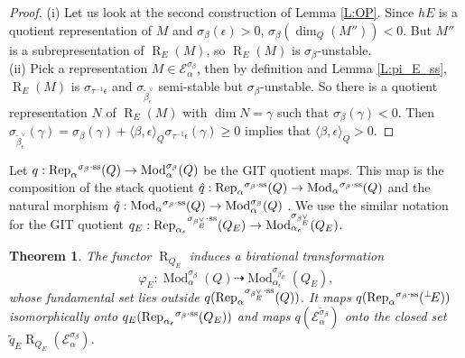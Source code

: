 \documentclass{amsart}
\newtheorem{theorem}{Theorem}[section]
\theoremstyle{definition}
\theoremstyle{remark}
\numberwithin{equation}{section}
\begin{document}
\begin{proof} (i) Let us look at the second construction of Lemma \ref{L:OP}. Since $hE$ is a quotient representation of $M$ and $\sigma_\beta(\epsilon)>0$, $\sigma_\beta(\dim_Q(M''))<0$. But $M''$ is a subrepresentation of ${\operatorname{R}}_E(M)$, so ${\operatorname{R}}_E(M)$ is $\sigma_\beta$-unstable.\\
(ii) Pick a representation $M\in{\mathcal{{E}}}_\alpha^{\sigma_\beta}$, then by definition and Lemma \ref{L:pi_E_ss}, ${\operatorname{R}}_E(M)$ is $\sigma_{\tau^{-1}\epsilon}$ and $\sigma_{\tilde{\beta}_\epsilon^\vee}$ semi-stable but $\sigma_\beta$-unstable. So there is a quotient representation $N$ of ${\operatorname{R}}_E(M)$ with $\dim N=\gamma$ such that $\sigma_\beta(\gamma)<0$. Then $\sigma_{\tilde{\beta}_\epsilon^\vee}(\gamma)=\sigma_\beta(\gamma)+{\langle{\beta,\epsilon}\rangle}_Q\sigma_{\tau^{-1}\epsilon}(\gamma)\geqslant 0$ implies that ${\langle{\beta,\epsilon}\rangle}_Q>0$.
\end{proof}

Let $q:{\operatorname{Rep}}_\alpha{^{\sigma_{{\beta}}\cdot{\rm {ss}}}}(Q)\to {\operatorname{Mod}}_\alpha^{\sigma_\beta}(Q)$ be the GIT quotient maps. This map is the composition of the stack quotient $\hat{q}:{\operatorname{Rep}}_\alpha{^{\sigma_{{\beta}}\cdot{\rm {ss}}}}(Q)\to {\operatorname{Mod}}_\alpha{^{\sigma_{{\beta}}\cdot{\rm {ss}}}}(Q)$  and the natural morphism $\tilde{q}: {\operatorname{Mod}}_\alpha{^{\sigma_{{\beta}}\cdot{\rm {ss}}}}(Q)\to{\operatorname{Mod}}_\alpha^{\sigma_\beta}(Q)$ \cite{G}.
We use the similar notation for the GIT quotient $q_E: {\operatorname{Rep}}_{\alpha_\epsilon}{^{\sigma_{{\beta_E^\vee}}\cdot{\rm {ss}}}}(Q_E)\to{\operatorname{Mod}}_{\alpha_\epsilon}^{\sigma_{\beta_E^\vee}}(Q_E)$.

\begin{theorem} \label{T:birational}
The functor ${\operatorname{R}}_{Q_E}$ induces a birational transformation $$\varphi_E:{\operatorname{Mod}}_\alpha^{\sigma_\beta}(Q)\dashrightarrow{\operatorname{Mod}}_{\alpha_\epsilon}^{\sigma_{\beta_E^\vee}}(Q_E),$$
whose fundamental set lies outside $q({\operatorname{Rep}}_\alpha{^{\sigma_{{\beta_E^\vee}}\cdot{\rm {ss}}}}(Q))$.
It maps $q({\operatorname{Rep}}_\alpha{^{\sigma_{{\beta}}\cdot{\rm {ss}}}}({{^\perp}\!} E))$ isomorphically onto $q_E({\operatorname{Rep}}_{\alpha_\epsilon}{^{\sigma_{{\beta}}\cdot{\rm {ss}}}}(Q_E))$ and maps $q(\overline{{\mathcal{{E}}}_\alpha^{\sigma_\beta}})$ onto the closed set $\tilde{q}_E{\operatorname{R}}_{Q_E}({\mathcal{{E}}}_\alpha^{\sigma_\beta})$.
\end{theorem}
\end{document}
